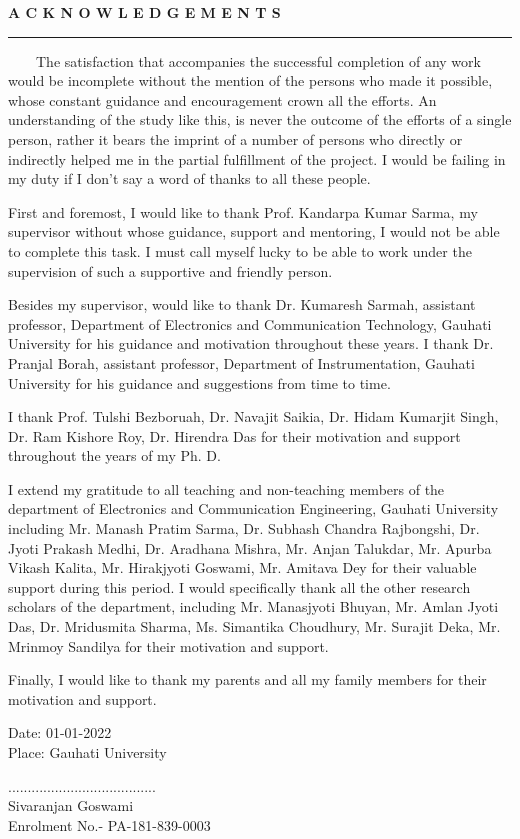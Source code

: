 \begin{center}
{\bf \large A C K N O W L E D G E M E N T S}
\end{center}
\rule{\linewidth}{2mm} \pagestyle{empty} \vspace{0.25in}

~~~~The satisfaction that accompanies the successful completion of any work would be incomplete without the mention of the persons who made it possible, whose constant guidance and encouragement crown all the efforts. An understanding of the study like this, is never the outcome of the efforts of a single person, rather it bears the imprint of a number of persons who directly or indirectly helped me in the partial fulfillment of the project. I would be failing in my duty if I don't say a word of thanks to all these people.

First and foremost, I would like to thank Prof. Kandarpa Kumar Sarma, my supervisor without whose guidance, support and mentoring, I would not be able to complete this task. I must call myself lucky to be able to work under the supervision of such a supportive and friendly person.

Besides my supervisor, would like to thank Dr. Kumaresh Sarmah, assistant professor, Department of Electronics and Communication Technology, Gauhati University for his guidance and motivation throughout these years. I thank Dr. Pranjal Borah, assistant professor, Department of Instrumentation, Gauhati University for his guidance and suggestions from time to time.

I thank Prof. Tulshi Bezboruah, Dr. Navajit Saikia, Dr. Hidam Kumarjit Singh, Dr. Ram Kishore Roy, Dr. Hirendra Das for their motivation and support throughout the years of my Ph. D.

I extend my gratitude to all teaching and non-teaching members of the department of Electronics and Communication Engineering, Gauhati University including Mr. Manash Pratim Sarma, Dr. Subhash Chandra Rajbongshi, Dr. Jyoti Prakash Medhi, Dr. Aradhana Mishra, Mr. Anjan Talukdar, Mr. Apurba Vikash Kalita, Mr. Hirakjyoti Goswami, Mr. Amitava Dey for their valuable support during this period. I would specifically thank all the other research scholars of the department, including Mr. Manasjyoti Bhuyan, Mr. Amlan Jyoti Das, Dr. Mridusmita Sharma, Ms. Simantika Choudhury, Mr. Surajit Deka, Mr. Mrinmoy Sandilya for their motivation and support.

Finally, I would like to thank my parents and all my family members for their motivation and support.


\vspace*{11mm}





\goodbreak
\begin{multicols}{2}
\begin{flushleft}
Date: 01-01-2022 \\
Place: Gauhati University \\
\end{flushleft}

\begin{flushright}
...................................... \\
Sivaranjan Goswami \\
Enrolment No.- PA-181-839-0003\\
\end{flushright}
\end{multicols}
